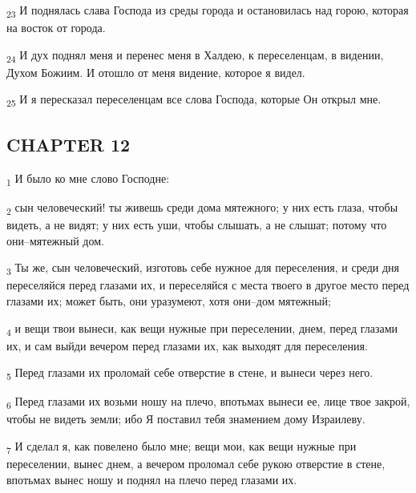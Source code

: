 \begin{tcolorbox}
\textsubscript{23} И поднялась слава Господа из среды города и остановилась над горою, которая на восток от города.
\end{tcolorbox}
\begin{tcolorbox}
\textsubscript{24} И дух поднял меня и перенес меня в Халдею, к переселенцам, в видении, Духом Божиим. И отошло от меня видение, которое я видел.
\end{tcolorbox}
\begin{tcolorbox}
\textsubscript{25} И я пересказал переселенцам все слова Господа, которые Он открыл мне.
\end{tcolorbox}
\subsection{CHAPTER 12}
\begin{tcolorbox}
\textsubscript{1} И было ко мне слово Господне:
\end{tcolorbox}
\begin{tcolorbox}
\textsubscript{2} сын человеческий! ты живешь среди дома мятежного; у них есть глаза, чтобы видеть, а не видят; у них есть уши, чтобы слышать, а не слышат; потому что они--мятежный дом.
\end{tcolorbox}
\begin{tcolorbox}
\textsubscript{3} Ты же, сын человеческий, изготовь себе нужное для переселения, и среди дня переселяйся перед глазами их, и переселяйся с места твоего в другое место перед глазами их; может быть, они уразумеют, хотя они--дом мятежный;
\end{tcolorbox}
\begin{tcolorbox}
\textsubscript{4} и вещи твои вынеси, как вещи нужные при переселении, днем, перед глазами их, и сам выйди вечером перед глазами их, как выходят для переселения.
\end{tcolorbox}
\begin{tcolorbox}
\textsubscript{5} Перед глазами их проломай себе отверстие в стене, и вынеси через него.
\end{tcolorbox}
\begin{tcolorbox}
\textsubscript{6} Перед глазами их возьми ношу на плечо, впотьмах вынеси ее, лице твое закрой, чтобы не видеть земли; ибо Я поставил тебя знамением дому Израилеву.
\end{tcolorbox}
\begin{tcolorbox}
\textsubscript{7} И сделал я, как повелено было мне; вещи мои, как вещи нужные при переселении, вынес днем, а вечером проломал себе рукою отверстие в стене, впотьмах вынес ношу и поднял на плечо перед глазами их.
\end{tcolorbox}

